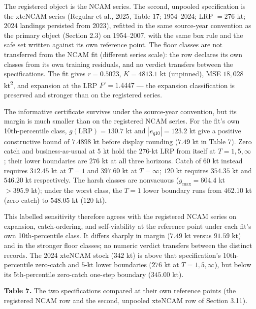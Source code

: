 The registered object is the NCAM series. The second, unpooled
specification is the xteNCAM series (Regular et al., 2025, Table 17;
1954--2024; LRP \(= 276\) kt; 2024 landings persisted from 2023),
refitted in the same source-year convention as the primary object
(Section 2.3) on 1954--2007, with the same box rule and the safe set
written against its own reference point. The floor
classes are not transferred from the NCAM fit (different series scale):
the row declares its own classes from its own training residuals, and no
verdict transfers between the specifications. The fit gives
\(r = 0.5023\), \(K = 4813.1\) kt (unpinned), MSE \(18{,}028\) kt\textsuperscript{2}, and
expansion at the LRP \(F' = 1.4447\) --- the expansion classification is
preserved and stronger than on the registered series.

The informative certificate survives under the source-year convention, but
its margin is much smaller than on the registered NCAM series. For the fit's
own 10th-percentile class, \(g(\mathrm{LRP}) = 130.7\) kt and
\(|e_{q10}| = 123.2\) kt give a positive constructive bound of
\(7.4898\) kt before display rounding (\(7.49\) kt in Table 7). Zero catch and business-as-usual at \(5\) kt hold the
\(276\)-kt LRP from itself at \(T=1,5,\infty\); their lower
boundaries are \(276\) kt at all three horizons. Catch of \(60\) kt
instead requires \(312.45\) kt at \(T=1\) and \(397.60\) kt at
\(T=\infty\); \(120\) kt requires \(354.35\) kt and \(546.20\)
kt respectively. The harsh classes are nonvacuous
(\(g_{\max} = 604.4\) kt \(> 395.9\) kt); under the worst class,
the \(T=1\) lower boundary runs from \(462.10\) kt (zero catch)
to \(548.05\) kt (\(120\) kt).

This labelled sensitivity therefore agrees with the registered NCAM
series on expansion, catch-ordering, and self-viability at the reference
point under each fit's own 10th-percentile class. It differs sharply in
margin (\(7.49\) kt versus \(91.59\) kt) and in the stronger floor
classes; no numeric verdict transfers between the distinct records.
The 2024 xteNCAM stock (\(342\) kt) is above that specification's
10th-percentile zero-catch and \(5\)-kt lower boundaries
(\(276\) kt at \(T=1,5,\infty\)), but below its 5th-percentile
zero-catch one-step boundary (\(345.00\) kt).

\textbf{Table 7.} The two specifications compared at their own reference
points (the registered NCAM row and the second, unpooled xteNCAM row of
Section 3.11).

